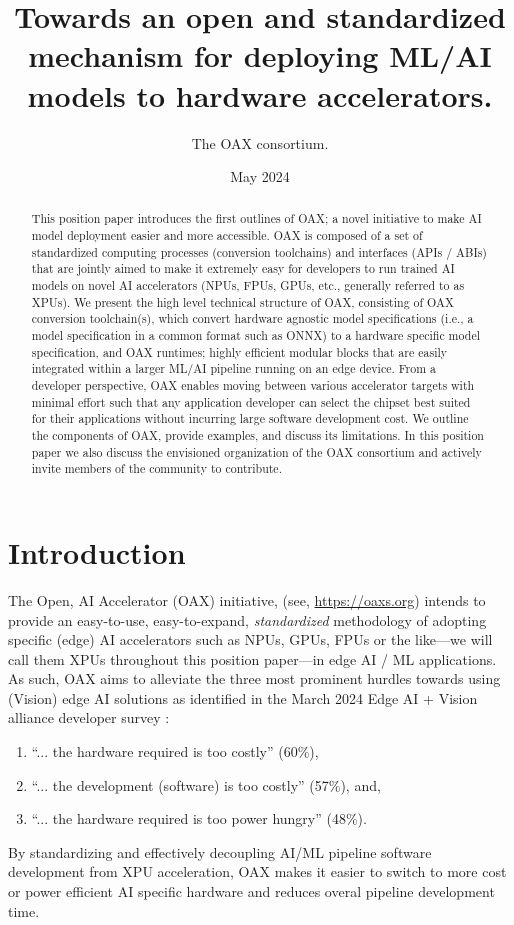 \documentclass{article}
\newcommand{\oaxweb}{\href{https://oaxs.org}{https://oaxs.org}}
\begin{document}
\title{Towards an open and standardized mechanism for deploying ML/AI models to hardware accelerators.}
\author{The OAX consortium.}
\date{May 2024}
\maketitle

\begin{abstract}
This position paper introduces the first outlines of OAX; a novel initiative to make AI model deployment easier and more accessible. OAX is composed of a set of standardized computing processes (conversion toolchains) and interfaces (APIs / ABIs) that are jointly aimed to make it extremely easy for developers to run trained AI models on novel AI accelerators  (NPUs, FPUs, GPUs, etc., generally referred to as XPUs). We present the high level technical structure of OAX, consisting of OAX conversion toolchain(s), which convert hardware agnostic model specifications (i.e., a model specification in a common format such as ONNX) to a hardware specific model specification, and OAX runtimes; highly efficient modular blocks that are easily integrated within a larger ML/AI pipeline running on an edge device. From a developer perspective, OAX enables moving between various accelerator targets with minimal effort such that any application developer can select the chipset best suited for their applications without incurring large software development cost. We outline the components of OAX, provide examples, and discuss its limitations. In this position paper we also discuss the envisioned organization of the OAX consortium and actively invite members of the community to contribute.
\end{abstract}

\tableofcontents

\section{Introduction}

The Open, AI Accelerator (OAX) initiative,  (see, \oaxweb) intends to provide an easy-to-use, easy-to-expand, \emph{standardized} methodology of adopting specific (edge) AI accelerators such as NPUs, GPUs, FPUs or the like---we will call them XPUs throughout this position paper---in edge AI / ML applications. As such, OAX aims to alleviate the three most prominent hurdles towards using (Vision) edge AI solutions as identified in the March 2024 Edge AI + Vision alliance developer survey \cite{EVS}: 
\begin{enumerate}
\item ``... the hardware required is too costly'' (60\%), 
\item ``... the development (software) is too costly'' (57\%), and, 
\item ``... the hardware required is too power hungry'' (48\%). 
\end{enumerate}
By standardizing and effectively decoupling AI/ML pipeline software development from XPU acceleration, OAX makes it easier to switch to more cost or power efficient AI specific hardware and reduces overal pipeline development time. 
\end{document}
